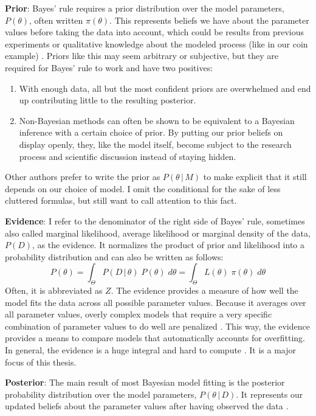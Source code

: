 \documentclass[12pt, a4paper]{report}
\begin{document}
\textbf{Prior}: Bayes' rule requires a prior distribution over the model parameters, $P(\theta)$, often written $\pi(\theta)$.
This represents beliefs we have about the parameter values before taking the data into account, which could be results from previous experiments or qualitative knowledge about the modeled process (like in our coin example) \cite[34 f.]{mcelreath}.
Priors like this may seem arbitrary or subjective, but they are required for Bayes' rule to work and have two positives:
\begin{enumerate}
    \item With enough data, all but the most confident priors are overwhelmed and end up contributing little to the resulting posterior.
    \item Non-Bayesian methods can often be shown to be equivalent to a Bayesian inference with a certain choice of prior. \cite[36]{mcelreath} By putting our prior beliefs on display openly, they, like the model itself, become subject to the research process and scientific discussion instead of staying hidden. 
\end{enumerate}
Other authors prefer to write the prior as $P(\theta \, | \, M)$ to make explicit that it still depends on our choice of model.
I omit the conditional for the sake of less cluttered formulas, but still want to call attention to this fact.

\textbf{Evidence}: I refer to the denominator of the right side of Bayes' rule, sometimes also called marginal likelihood, average likelihood or marginal density of the data, $P(D)$, as the evidence.
It normalizes the product of prior and likelihood into a probability distribution and can also be written as follows: 
\begin{equation}
    P(\theta) = \int_\Theta P(D \,|\, \theta) \; P(\theta) \; d\theta = \int_\Theta L(\theta) \; \pi(\theta) \; d\theta
    \label{eq:evidence}
\end{equation}
Often, it is abbreviated as $Z$.
The evidence provides a measure of how well the model fits the data across all possible parameter values.
Because it averages over all parameter values, overly complex models that require a very specific combination of parameter values to do well are penalized \cite[221]{mcelreath}.
This way, the evidence provides a means to compare models that automatically accounts for overfitting. 
In general, the evidence is a huge integral and hard to compute \cite[221]{mcelreath}.
It is a major focus of this thesis.

\textbf{Posterior}: The main result of most Bayesian model fitting is the posterior probability distribution over the model parameters, $P(\theta \,|\, D)$.
It represents our updated beliefs about the parameter values after having observed the data \cite[36]{mcelreath}.
\end{document}

